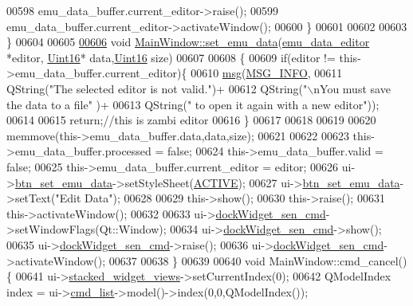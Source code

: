 \begin{DoxyCode}
00598       emu\_data\_buffer.current\_editor->raise();
00599       emu\_data\_buffer.current\_editor->activateWindow();
00600  \}
00601 
00602 
00603 \}
00604 
00605 
\hypertarget{a00134_source_l00606}{}\hyperlink{a00017_ae9bed0c4d2f2c63c95a68f53f65f4359}{00606} \textcolor{keywordtype}{void} \hyperlink{a00017_ae9bed0c4d2f2c63c95a68f53f65f4359}{MainWindow::set\_emu\_data}(\hyperlink{a00008}{emu\_data\_editor} *editor,
      \hyperlink{a00004_aae7407b021d43f7193a81a58cfb3e297}{Uint16}* data,\hyperlink{a00004_aae7407b021d43f7193a81a58cfb3e297}{Uint16} size)
00607 
00608 \{
00609     \textcolor{keywordflow}{if}(editor != this->emu\_data\_buffer.current\_editor)\{
00610       \hyperlink{a00017_a6134b74dbfffbaf333e169bd09597b53}{msg}(\hyperlink{a00090_a1ddcc97224a95cec04b38b0ac866fa19}{MSG\_INFO},
00611           QString(\textcolor{stringliteral}{"The selected editor is not valid."})+
00612           QString(\textcolor{stringliteral}{"\(\backslash\)nYou must save the data to a file"} )+
00613           QString(\textcolor{stringliteral}{" to open it again with a new editor"}));
00614 
00615         \textcolor{keywordflow}{return};\textcolor{comment}{//this is zambi editor}
00616     \}
00617 
00618 
00619 
00620     memmove(this->emu\_data\_buffer.data,data,size);
00621 
00622 
00623     this->emu\_data\_buffer.processed = \textcolor{keyword}{false};
00624     this->emu\_data\_buffer.valid = \textcolor{keyword}{false};
00625     this->emu\_data\_buffer.current\_editor = editor;
00626     ui->\hyperlink{a00080_ad05944ce9c8afb0ab60549a326b8e0af}{btn\_set\_emu\_data}->setStyleSheet(\hyperlink{a00090_a3a6d3cd70078e6046471ec528a09cd19}{ACTIVE});
00627     ui->\hyperlink{a00080_ad05944ce9c8afb0ab60549a326b8e0af}{btn\_set\_emu\_data}->setText(\textcolor{stringliteral}{"Edit Data"});
00628 
00629     this->show();
00630     this->\textcolor{keyword}{raise}();
00631     this->activateWindow();
00632 
00633     ui->\hyperlink{a00080_a9eb86a5ee396766f0f4a65f2d2bd7688}{dockWidget\_sen\_cmd}->setWindowFlags(Qt::Window);
00634     ui->\hyperlink{a00080_a9eb86a5ee396766f0f4a65f2d2bd7688}{dockWidget\_sen\_cmd}->show();
00635     ui->\hyperlink{a00080_a9eb86a5ee396766f0f4a65f2d2bd7688}{dockWidget\_sen\_cmd}->raise();
00636     ui->\hyperlink{a00080_a9eb86a5ee396766f0f4a65f2d2bd7688}{dockWidget\_sen\_cmd}->activateWindow();
00637 
00638 \}
00639 
00640 \textcolor{keywordtype}{void} MainWindow::cmd\_cancel()\{
00641     ui->\hyperlink{a00080_a59e39bd3d716004e840a5be5dda18b96}{stacked\_widget\_views}->setCurrentIndex(0);
00642     QModelIndex index = ui->\hyperlink{a00080_aa66ece71395b435e915d384fb63bac1d}{cmd\_list}->model()->index(0,0,QModelIndex());

\end{DoxyCode}
